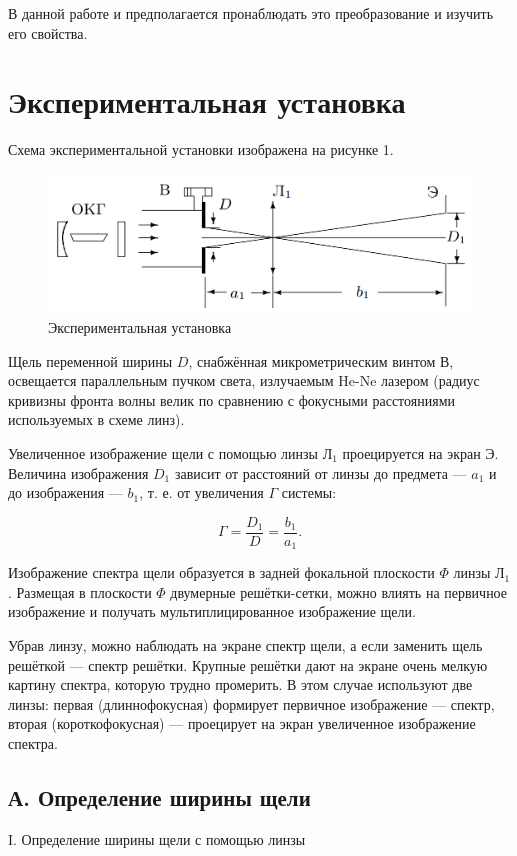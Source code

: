 \documentclass[a4paper,12pt]{article} %
\begin{document}
	В данной работе и предполагается пронаблюдать это преобразование и изучить его свойства.
	
	\section*{Экспериментальная установка}
	Схема экспериментальной установки изображена на рисунке 1.
	
	\begin{figure}[h!]
		\centering
		\includegraphics[scale=0.6]{Pictures/Установка}
		\caption{Экспериментальная установка}
	\end{figure}

	Щель переменной ширины $D$, снабжённая микрометрическим винтом В, освещается параллельным пучком света, излучаемым He-Ne лазером (радиус кривизны фронта волны велик по сравнению с фокусными расстояниями используемых в схеме линз). 
	
	Увеличенное изображение щели с помощью линзы Л$_1$ проецируется на экран Э. Величина изображения $D_1$ зависит от расстояний от линзы до предмета — $a_1$ и до изображения — $b_1$, т. е. от увеличения $\Gamma$ системы:
	
	\begin{equation*}
		\Gamma = \frac{D_1}{D} = \frac{b_1}{a_1}.
	\end{equation*}
	
	Изображение спектра щели образуется в задней фокальной плоскости $\Phi$ линзы Л$_1$. Размещая в плоскости $\Phi$ двумерные решётки-сетки, можно влиять на первичное изображение и получать мультиплицированное изображение щели. 
	
	Убрав линзу, можно наблюдать на экране спектр щели, а если заменить щель решёткой — спектр решётки. Крупные решётки дают на экране очень мелкую картину спектра, которую трудно промерить. В этом случае используют две линзы: первая (длиннофокусная) формирует первичное изображение — спектр, вторая (короткофокусная) — проецирует на экран увеличенное изображение спектра.
	
	\subsection*{А. Определение ширины щели}
		\begin{center}
			I. Определение ширины щели с помощью линзы
		\end{center}
	
\end{document}
